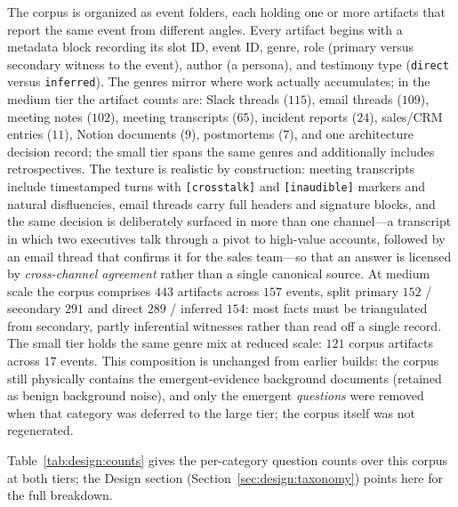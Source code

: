 The corpus is organized as event folders, each holding one or more artifacts that
report the same event from different angles. Every artifact begins with a
metadata block recording its slot ID, event ID, genre, role (primary versus
secondary witness to the event), author (a persona), and testimony type
(\texttt{direct} versus \texttt{inferred}). The genres mirror where work actually
accumulates; in the medium tier the artifact counts are: Slack threads ($115$),
email threads ($109$), meeting notes ($102$), meeting transcripts ($65$),
incident reports ($24$), sales/CRM entries ($11$), Notion documents ($9$),
postmortems ($7$), and one architecture decision record; the small tier spans the
same genres and additionally includes retrospectives. The texture is realistic by
construction: meeting transcripts include timestamped turns with
\texttt{[crosstalk]} and \texttt{[inaudible]} markers and natural disfluencies,
email threads carry full headers and signature blocks, and the same decision is
deliberately surfaced in more than one channel---a transcript in which two
executives talk through a pivot to high-value accounts, followed by an email
thread that confirms it for the sales team---so that an answer is licensed by
\emph{cross-channel agreement} rather than a single canonical source. At medium
scale the corpus comprises $443$ artifacts across $157$ events, split primary
$152$ / secondary $291$ and direct $289$ / inferred $154$: most facts must be
triangulated from secondary, partly inferential witnesses rather than read off a
single record. The small tier holds the same genre mix at reduced scale: $121$
corpus artifacts across $17$ events. This composition is unchanged from earlier
builds: the corpus still physically contains the emergent-evidence background
documents (retained as benign background noise), and only the emergent
\emph{questions} were removed when that category was deferred to the large tier;
the corpus itself was not regenerated.

Table~\ref{tab:design:counts} gives the per-category question counts over this
corpus at both tiers; the Design section (Section~\ref{sec:design:taxonomy})
points here for the full breakdown.

